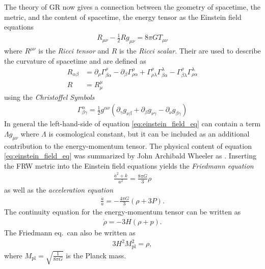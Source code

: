 \documentclass[a4paper, 12pt]{article}
\begin{document}
\noindent
The theory of GR now gives a connection between the geometry of spacetime,
the metric, and the content of spacetime, the energy tensor as the
Einstein field equations \cite[Eq. 3.1]{TheEarlyUniverseKolbAndTurner}
\begin{align}
    \label{eq:einstein_field_eq}
    R_{\mu \nu} - \frac{1}{2} R g_{\mu \nu} = 8 \pi G T_{\mu\nu}
\end{align}
where $R^{\mu \nu}$ is the \emph{Ricci tensor} and $R$ is the \emph{Ricci scalar}. Their are used to describe the
curvature of spacetime and are defined as \cite[Eq. 92.7]{Landau}
\begin{align}
    \label{eq:ricci}
    R_{\alpha \beta} &= \partial_\rho \Gamma^\rho_{\beta \alpha} - \partial_\beta \Gamma^\rho_{\rho \alpha} + \Gamma^\rho_{\rho \lambda} \Gamma^\lambda_{\beta \alpha} - \Gamma^\rho_{\beta \lambda} \Gamma^\lambda_{\rho \alpha} \\
    R &= R^\mu_\mu
\end{align}
using the \emph{Christoffel Symbols} \cite[Eq. 86.3]{Landau}
\begin{align}
    \Gamma^\alpha_{\beta \gamma} = \frac{1}{2} g^{\alpha \nu} \left( \partial_\gamma g_{\nu \beta} + \partial_\beta g_{\nu \gamma} - \partial_\nu g_{\beta \gamma} \right)
\end{align}
In general the left-hand-side of equation \ref{eq:einstein_field_eq} can contain a term $\Lambda g_{\mu \nu}$
where $\Lambda$ is cosmological constant, but it can be included as an additional
contribution to the energy-momentum tensor.
The physical content of equation \ref{eq:einstein_field_eq} was summarized
by John Archibald Wheeler as
 \cite[P. 5, left ]{Gravitation}.
Inserting the FRW metric into the Einstein field equations yields
the \emph{Friedmann equation} \cite[Eq. 3.10]{TheEarlyUniverseKolbAndTurner}
\begin{align}
    \label{eq:friedmann_eq}
    \frac{\dot{a}^2 + k}{a^2} = \frac{8 \pi G}{3} \rho
\end{align}
as well as
the \emph{acceleration equation} \cite[Eq. 3.11]{TheEarlyUniverseKolbAndTurner}
\begin{align}
    \label{eq:accelaration_eq}
    \frac{\ddot{a}}{a} = - \frac{4 \pi G}{3} \left( \rho + 3 P \right).
\end{align}
The continuity equation for the energy-momentum tensor can be written as
\begin{align}
    \label{eq:cont}
   \dot{\rho} = - 3 H \left( \rho + p \right).
\end{align}
The Friedmann eq.\ can also be written as \cite[Sec. 1.3.3, Eq. 1.67]{CosmologyBookMukhanov}
\begin{align}
    \label{eq:friedmann_equation}
    3 H^2 M^2_\mathrm{pl} = \rho,
\end{align}
where $M_\mathrm{pl} = \sqrt{\frac{1}{8 \pi G}}$
is the Planck mass.
\end{document}
